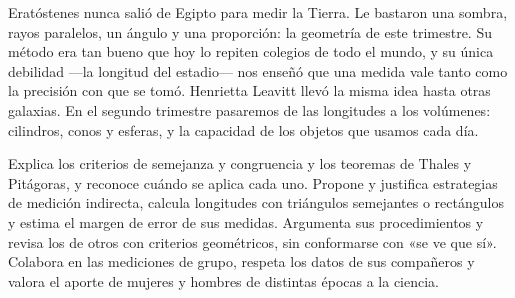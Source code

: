 \documentclass[11pt]{article}
\begin{document}

Eratóstenes nunca salió de Egipto para medir la Tierra. Le bastaron una sombra,
rayos paralelos, un ángulo y una proporción: la geometría de este trimestre. Su
método era tan bueno que hoy lo repiten colegios de todo el mundo, y su única
debilidad ---la longitud del estadio--- nos enseñó que una medida vale tanto como
la precisión con que se tomó. Henrietta Leavitt llevó la misma idea hasta otras
galaxias. En el segundo trimestre pasaremos de las longitudes a los volúmenes:
cilindros, conos y esferas, y la capacidad de los objetos que usamos cada día.

\matrizevaluacion
  {Explica los criterios de semejanza y congruencia y los teoremas de Thales y
   Pitágoras, y reconoce cuándo se aplica cada uno.}
  {Propone y justifica estrategias de medición indirecta, calcula longitudes con
   triángulos semejantes o rectángulos y estima el margen de error de sus medidas.}
  {Argumenta sus procedimientos y revisa los de otros con criterios geométricos, sin
   conformarse con «se ve que sí».}
  {Colabora en las mediciones de grupo, respeta los datos de sus compañeros y valora
   el aporte de mujeres y hombres de distintas épocas a la ciencia.}

\autoevaluacion

\seguimientodocente
\end{document}
